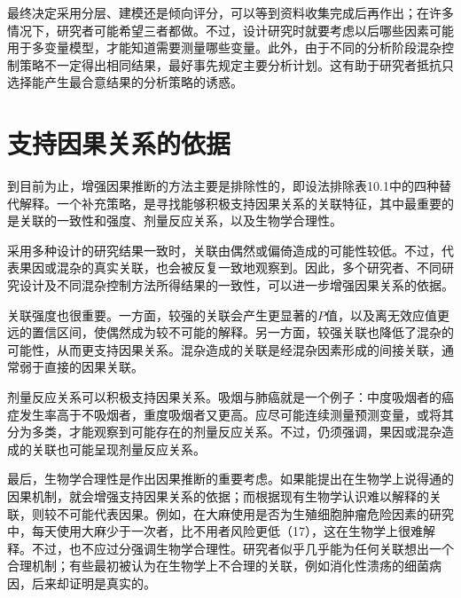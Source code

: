 最终决定采用分层、建模还是倾向评分，可以等到资料收集完成后再作出；在许多情况下，研究者可能希望三者都做。不过，设计研究时就要考虑以后哪些因素可能用于多变量模型，才能知道需要测量哪些变量。此外，由于不同的分析阶段混杂控制策略不一定得出相同结果，最好事先规定主要分析计划。这有助于研究者抵抗只选择能产生最合意结果的分析策略的诱惑。

\section{支持因果关系的依据}
到目前为止，增强因果推断的方法主要是排除性的，即设法排除表10.1中的四种替代解释。一个补充策略，是寻找能够积极支持因果关系的关联特征，其中最重要的是关联的一致性和强度、剂量反应关系，以及生物学合理性。

采用多种设计的研究结果一致时，关联由偶然或偏倚造成的可能性较低。不过，代表果因或混杂的真实关联，也会被反复一致地观察到。因此，多个研究者、不同研究设计及不同混杂控制方法所得结果的一致性，可以进一步增强因果关系的依据。

关联强度也很重要。一方面，较强的关联会产生更显著的$P$值，以及离无效应值更远的置信区间，使偶然成为较不可能的解释。另一方面，较强关联也降低了混杂的可能性，从而更支持因果关系。混杂造成的关联是经混杂因素形成的间接关联，通常弱于直接的因果关联。

剂量反应关系可以积极支持因果关系。吸烟与肺癌就是一个例子：中度吸烟者的癌症发生率高于不吸烟者，重度吸烟者又更高。应尽可能连续测量预测变量，或将其分为多类，才能观察到可能存在的剂量反应关系。不过，仍须强调，果因或混杂造成的关联也可能呈现剂量反应关系。

最后，生物学合理性是作出因果推断的重要考虑。如果能提出在生物学上说得通的因果机制，就会增强支持因果关系的依据；而根据现有生物学认识难以解释的关联，则较不可能代表因果。例如，在大麻使用是否为生殖细胞肿瘤危险因素的研究中，每天使用大麻少于一次者，比不用者风险更低（17），这在生物学上很难解释。不过，也不应过分强调生物学合理性。研究者似乎几乎能为任何关联想出一个合理机制；有些最初被认为在生物学上不合理的关联，例如消化性溃疡的细菌病因，后来却证明是真实的。

